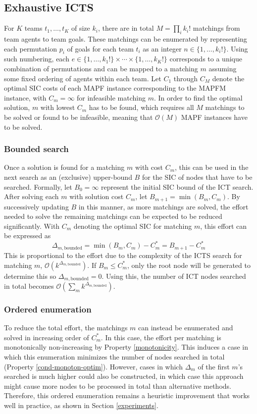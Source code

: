 \documentclass[english]{article}
\begin{document}
	\subsection{Exhaustive ICTS}
	\label{exhaustive}
	For $K$ teams $t_1,\ldots,t_K$ of size $k_i$, there are in total $M = \prod_{i} k_i!$ matchings from team agents to team goals. These matchings can be enumerated by representing each permutation $p_i$ of goals for each team $t_i$ as an integer $n \in \{1,\ldots,k_i!\}$. Using such numbering, each $e \in \{1,\ldots,k_1!\} \times \cdots \times \{1,\ldots,k_K!\}$ corresponds to a unique combination of permutations and can be mapped to a matching $m$ assuming some fixed ordering of agents within each team. Let $C_1$ through $C_M$ denote the optimal SIC costs of each MAPF instance corresponding to the MAPFM instance, with $C_m = \infty$ for infeasible matching $m$. In order to find the optimal solution, $m$ with lowest $C_m$ has to be found, which requires all $M$ matchings to be solved or found to be infeasible, meaning that $\mathcal{O}(M)$ MAPF instances have to be solved. 
	\subsubsection{Bounded search}
	Once a solution is found for a matching $m$ with cost $C_m$, this can be used in the next search as an (exclusive) upper-bound $B$ for the SIC of nodes that have to be searched. Formally, let $B_0 = \infty$ represent the initial SIC bound of the ICT search. After solving each $m$ with solution cost $C_m$, let $B_{m+1} = \min(B_m,C_m)$. By successively updating $B$ in this manner, as more matchings are solved, the effort needed to solve the remaining matchings can be expected to be reduced significantly. With $C_m$ denoting the optimal SIC for matching $m$, this effort can be expressed as	
	\[\Delta_{m,\text{bounded}} = \min(B_m,C_m) - C^*_m = B_{m+1} - C^*_m\]
	This is proportional to the effort due to the complexity of the ICTS search for matching $m$, $\mathcal{O}(k^{\Delta_{m,\text{bounded}}})$.
	If $B_m \leq C^*_m$, only the root node will be generated to determine this so $\Delta_{m,\text{bounded}} = 0$.
	Using this, the number of ICT nodes searched in total becomes $\mathcal{O}(\sum_m k^{\Delta_{m,\text{bounded}}})$.
	\subsubsection{Ordered enumeration}
	\label{ordered-enum}
	To reduce the total effort, the matchings $m$ can instead be enumerated and solved in increasing order of $C^*_m$. In this case, the effort per matching is monotonically non-increasing by Property \ref{monotonicity}. This induces a case in which this enumeration minimizes the number of nodes searched in total (Property \ref{cond-monoton-optim}). However, cases in which $\Delta_m$ of the first $m$'s searched is much higher could also be constructed, in which case this approach might cause more nodes to be processed in total than alternative methods. Therefore, this ordered enumeration remains a heuristic improvement that works well in practice, as shown in Section \ref{experiments}.
	
\end{document}
